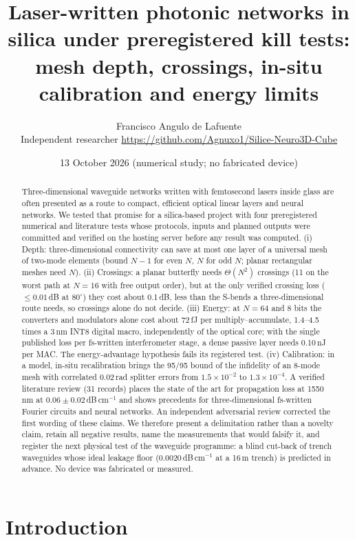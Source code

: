 \documentclass[10pt,a4paper]{article}
\title{Laser-written photonic networks in silica under preregistered kill tests: mesh depth, crossings, in-situ calibration and energy limits}
\author{Francisco Angulo de Lafuente\\
\small Independent researcher \quad \url{https://github.com/Agnuxo1/Silice-Neuro3D-Cube}}
\date{13 October 2026 \quad (numerical study; no fabricated device)}
\newcommand{\dBcm}{\,dB\,cm$^{-1}$\xspace}
\begin{document}
\maketitle

\begin{abstract}
Three-dimensional waveguide networks written with femtosecond lasers inside glass are often presented as a route to compact, efficient optical linear layers and neural networks. We tested that promise for a silica-based project with four preregistered numerical and literature tests whose protocols, inputs and planned outputs were committed and verified on the hosting server before any result was computed. (i) Depth: three-dimensional connectivity can save at most one layer of a universal mesh of two-mode elements (bound $N-1$ for even $N$, $N$ for odd $N$; planar rectangular meshes need $N$). (ii) Crossings: a planar butterfly needs $\Theta(N^2)$ crossings (11 on the worst path at $N=16$ with free output order), but at the only verified crossing loss ($\le0.01$\,dB at 80$^\circ$) they cost about 0.1\,dB, less than the S-bends a three-dimensional route needs, so crossings alone do not decide. (iii) Energy: at $N=64$ and 8 bits the converters and modulators alone cost about 72\,fJ per multiply--accumulate, 1.4--4.5 times a 3\,nm INT8 digital macro, independently of the optical core; with the single published loss per fs-written interferometer stage, a dense passive layer needs 0.10\,nJ per MAC. The energy-advantage hypothesis fails its registered test. (iv) Calibration: in a model, in-situ recalibration brings the 95/95 bound of the infidelity of an 8-mode mesh with correlated 0.02\,rad splitter errors from $1.5\times10^{-2}$ to $1.3\times10^{-4}$. A verified literature review (31 records) places the state of the art for propagation loss at 1550\,nm at $0.06\pm0.02$\dBcm and shows precedents for three-dimensional fs-written Fourier circuits and neural networks. An independent adversarial review corrected the first wording of these claims. We therefore present a delimitation rather than a novelty claim, retain all negative results, name the measurements that would falsify it, and register the next physical test of the waveguide programme: a blind cut-back of trench waveguides whose ideal leakage floor (0.0020\dBcm at a 16\,\textmu m trench) is predicted in advance. No device was fabricated or measured.
\end{abstract}

\section{Introduction}
\end{document}
